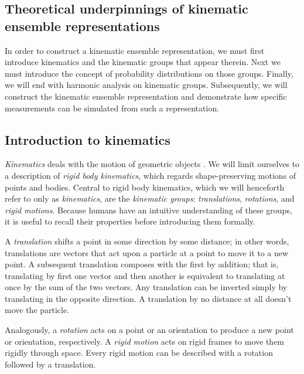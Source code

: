 \documentclass[../main.tex]{subfiles}
\begin{document}
\begin{refsection}


\section{Theoretical underpinnings of kinematic ensemble representations}\label{theoretical-underpinnings-of-kinematic-ensemble-representations}

In order to construct a kinematic ensemble representation, we must first introduce kinematics and the kinematic groups that appear therein.
Next we must introduce the concept of probability distributions on those groups.
Finally, we will end with harmonic analysis on kinematic groups.
Subsequently, we will construct the kinematic ensemble representation and demonstrate how specific measurements can be simulated from such a representation.

\subsection{Introduction to kinematics}\label{introduction-to-kinematics}

\emph{Kinematics} deals with the motion of geometric objects \cite{chirikjian_harmonic_2016}.
We will limit ourselves to a description of \emph{rigid body kinematics}, which regards shape-preserving motions of points and bodies.
Central to rigid body kinematics, which we will henceforth refer to only as \emph{kinematics}, are the \emph{kinematic groups}: \emph{translations}, \emph{rotations}, and \emph{rigid motions}.
Because humans have an intuitive understanding of these groups, it is useful to recall their properties before introducing them formally.

A \emph{translation} shifts a point in some direction by some distance; in other words, translations are vectors that act upon a particle at a point to move it to a new point.
A subsequent translation composes with the first by addition; that is, translating by first one vector and then another is equivalent to translating at once by the sum of the two vectors.
Any translation can be inverted simply by translating in the opposite direction.
A translation by no distance at all doesn't move the particle.

Analogously, a \emph{rotation} acts on a point or an orientation to produce a new point or orientation, respectively.
A \emph{rigid motion} acts on rigid frames to move them rigidly through space.
Every rigid motion can be described with a rotation followed by a translation.


\end{refsection}
\end{document}
